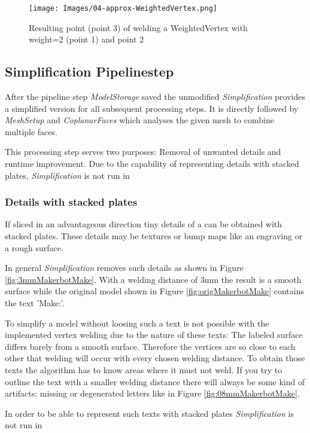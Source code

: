 \documentclass[../ClassicThesis.tex]{subfiles}
\begin{document}
\begin{figure}
\texttt{[image: Images/04-approx-WeightedVertex.png]}
\caption{Resulting point (point 3) of welding a WeightedVertex with weight=2 (point 1) and point 2}
\label{fig:weightedVertex}
\end{figure}

\subsection{Simplification Pipelinestep}

After the pipeline step \emph{ModelStorage} saved the unmodified {\threedmodel} \emph{Simplification} provides a simplified version for all subsequent processing steps. It is directly followed by \emph{MeshSetup} and \emph{CoplanarFaces} which analyses the given mesh to combine multiple faces. 

This processing step serves two purposes: Removal of unwanted details and runtime improvement. Due to the capability of representing details with stacked plates, \emph{Simplification} is not run in 

\subsubsection{Details with stacked plates}

If sliced in an advantageous direction tiny details of a {\threedmodel} can be obtained with stacked plates. These details may be textures or bump maps like an engraving or a rough surface.

In general \emph{Simplification} removes such details as shown in Figure \ref{fig:3mmMakerbotMake}. With a welding distance of 3mm the result is a smooth surface while the original model shown in Figure \ref{fig:origMakerbotMake} contains the text 'Make:'.

To simplify a model without loosing such a text is not possible with the implemented vertex welding due to the nature of these texts: The labeled surface differs barely from a smooth surface. Therefore the vertices are so close to each other that welding will occur with every chosen welding distance. To obtain those texts the algorithm has to know areas where it must not weld. If you try to outline the text with a smaller welding distance there will always be some kind of artifacts: missing or degenerated letters like in Figure \ref{fig:08mmMakerbotMake}.

In order to be able to represent such texts with stacked plates \emph{Simplification} is not run in 
\end{document}
